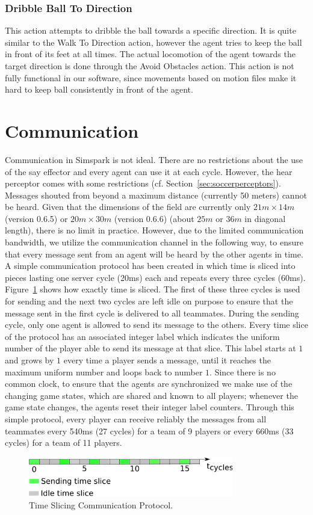 \subsubsection*{Dribble Ball To Direction}
This action attempts to dribble the ball towards a specific direction. It is quite similar to the Walk To Direction action, however the agent  tries to keep the ball in front of its feet at all times.  The actual locomotion of the agent towards the target direction is done through the Avoid Obstacles action. This action is not fully functional in our software, since movements based on motion files make it hard to keep ball consistently in front of the agent. 



\section{Communication}
Communication in Simspark is not ideal. There are no restrictions about the use of the say effector and every agent can use it at each cycle. However, the hear perceptor comes with some restrictions (cf. Section~\ref{sec:soccerperceptors}). Messages shouted from beyond a maximum distance (currently 50 meters) cannot be heard. Given that the dimensions of the field are currently only $21m\times14m$ (version 0.6.5) or $20m\times 30m$ (version 0.6.6) (about $25m$ or $36m$ in diagonal length), there is no limit in practice. However, due to the limited communication bandwidth, we utilize the communication channel in the following way, to ensure that every message sent from an agent will be heard by the other agents in time. A simple communication protocol has been created in which time is sliced into pieces lasting one server cycle (20ms) each and repeats every three cycles (60ms). Figure~\ref{fig:TimeSlicing} shows how exactly time is sliced. The first of these three cycles is used for sending and the next two cycles are left idle on purpose to ensure that the message sent in the first cycle is delivered to all teammates. During the sending cycle, only one agent is allowed to send its message to the others. Every time slice of the protocol has an associated integer label which indicates the uniform number of the player able to send its message at that slice. This label starts at $1$ and grows by $1$ every time a player sends a message, until it reaches the maximum uniform number and loops back to number $1$. Since there is no common clock, to ensure that the agents are synchronized we make use of the changing game states, which are shared and known to all players; whenever the game state changes, the agents reset their integer label counters. Through this simple protocol, every player can receive reliably the messages from all teammates every 540ms (27 cycles) for a team of 9 players or every 660ms (33 cycles) for a team of 11 players.

\begin{figure}[t!]
\centering
  \includegraphics[width=0.8\textwidth]{Chapter3/figures/MAC.pdf}  
  \caption{Time Slicing Communication Protocol.}
  \label{fig:TimeSlicing}
\end{figure} 